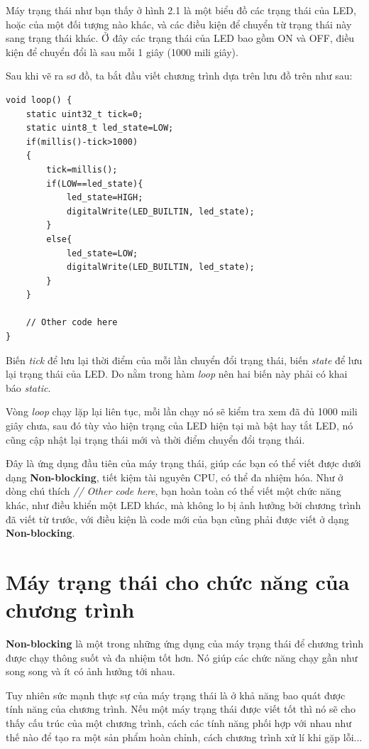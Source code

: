 Máy trạng thái như bạn thấy ở hình 2.1 là một biểu đồ các trạng thái của LED, hoặc của một đối tượng nào khác, và các điều kiện để chuyển từ trạng thái này sang trạng thái khác. Ở đây các trạng thái của LED bao gồm ON và OFF, điều kiện để chuyển đổi là sau mỗi 1 giây (1000 mili giây).

Sau khi vẽ ra sơ đồ, ta bắt đầu viết chương trình dựa trên lưu đồ trên như sau:

\begin{lstlisting}
void loop() {
    static uint32_t tick=0;
    static uint8_t led_state=LOW;
    if(millis()-tick>1000)
    {
        tick=millis();
        if(LOW==led_state){
            led_state=HIGH;
            digitalWrite(LED_BUILTIN, led_state);
        }
        else{
            led_state=LOW;
            digitalWrite(LED_BUILTIN, led_state);
        }
    }

    // Other code here
}
\end{lstlisting}

Biến \textit{tick} để lưu lại thời điểm của mỗi lần chuyển đổi trạng thái, biến \textit{state} để lưu lại trạng thái của LED. Do nằm trong hàm \textit{loop} nên hai biến này phải có khai báo \textit{static}.

Vòng \textit{loop} chạy lặp lại liên tục, mỗi lần chạy nó sẽ kiểm tra xem đã đủ 1000 mili giây chưa, sau đó tùy vào hiện trạng của LED hiện tại mà bật hay tắt LED, nó cũng cập nhật lại trạng thái mới và thời điểm chuyển đổi trạng thái.

Đây là ứng dụng đầu tiên của máy trạng thái, giúp các bạn có thể viết được dưới dạng \textbf{Non-blocking}, tiết kiệm tài nguyên CPU, có thể đa nhiệm hóa. Như ở dòng chú thích \textit{// Other code here}, bạn hoàn toàn có thể viết một chức năng khác, như điều khiển một LED khác, mà không lo bị ảnh hưởng bởi chương trình đã viết từ trước, với điều kiện là code mới của bạn cũng phải được viết ở dạng \textbf{Non-blocking}.

\section{Máy trạng thái cho chức năng của chương trình}

\textbf{Non-blocking} là một trong những ứng dụng của máy trạng thái để chương trình được chạy thông suốt và đa nhiệm tốt hơn. Nó giúp các chức năng chạy gần như song song và ít có ảnh hưởng tới nhau.

Tuy nhiên sức mạnh thực sự của máy trạng thái là ở khả năng bao quát được tính năng của chương trình. Nếu một máy trạng thái được viết tốt thì nó sẽ cho thấy cấu trúc của một chương trình, cách các tính năng phối hợp với nhau như thế nào để tạo ra một sản phẩm hoàn chỉnh, cách chương trình xử lí khi gặp lỗi...

